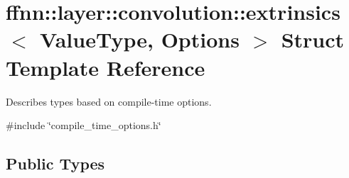 \hypertarget{structffnn_1_1layer_1_1convolution_1_1extrinsics}{\section{ffnn\-:\-:layer\-:\-:convolution\-:\-:extrinsics$<$ Value\-Type, Options $>$ Struct Template Reference}
\label{structffnn_1_1layer_1_1convolution_1_1extrinsics}
}


Describes types based on compile-\/time options.  




{\ttfamily \#include \char`\"{}compile\-\_\-time\-\_\-options.\-h\char`\"{}}

\subsection*{Public Types}
